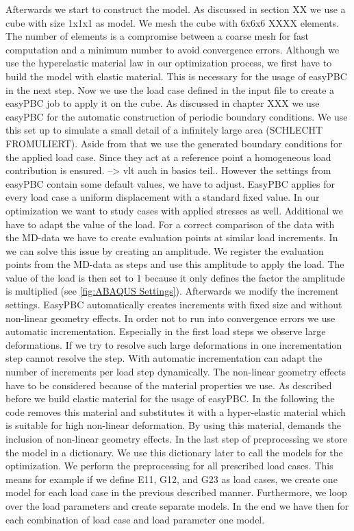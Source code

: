     Afterwards we start to construct the model. As discussed in section XX we use a cube with size 1x1x1 as model. We mesh the cube with 6x6x6 XXXX elements. The number of elements is a compromise between a coarse mesh for fast computation and a minimum number to avoid convergence errors. Although we use the hyperelastic material law in our optimization process, we first have to build the model with elastic material. This is necessary for the usage of easyPBC in the next step. Now we use the load case defined in the input file to create a easyPBC job to apply it on the cube. As discussed in chapter XXX we use easyPBC for the automatic construction of periodic boundary conditions. We use this set up to simulate a small detail of a infinitely large area (SCHLECHT FROMULIERT). Aside from that we use the generated boundary conditions for the applied load case. Since they act at a reference point a homogeneous load contribution is ensured. --> vlt auch in basics teil..
    However the settings from easyPBC contain some default values, we have to adjust. EasyPBC applies for every load case a uniform displacement with a standard fixed value. In our optimization we want to study cases with applied stresses as well. Additional we have to adapt the value of the load. For a correct comparison of the  data with the MD-data we have to create evaluation points at similar load increments. In  we can solve this issue by creating an amplitude. We register the evaluation points from the MD-data as steps and use this amplitude to apply the load. The value of the load is then set to 1 because it only defines the factor the amplitude is multiplied (see \autoref{fig:ABAQUS Settings}). Afterwards we modify the increment settings. EasyPBC automatically creates increments with fixed size and without non-linear geometry effects. In order not to run into convergence errors we use automatic incrementation. Especially in the first load steps we observe large deformations. If we try to resolve such large deformations in one incrementation step  cannot resolve the step. With automatic incrementation  can adapt the number of increments per load step dynamically. The non-linear geometry effects have to be considered because of the material properties we use. As described before we build elastic material for the usage of easyPBC. In the following the code removes this material and substitutes it with a hyper-elastic material which is suitable for high non-linear deformation. By using this material,  demands the inclusion of non-linear geometry effects. In the last step of preprocessing we store the model in a dictionary. We use this dictionary later to call the models for the optimization. We perform the preprocessing for all prescribed load cases. This means for example if we define E11, G12, and G23 as load cases, we create one model for each load case in the previous described manner. Furthermore, we loop over the load parameters and create separate models. In the end we have then for each combination of load case and load parameter one model. 


